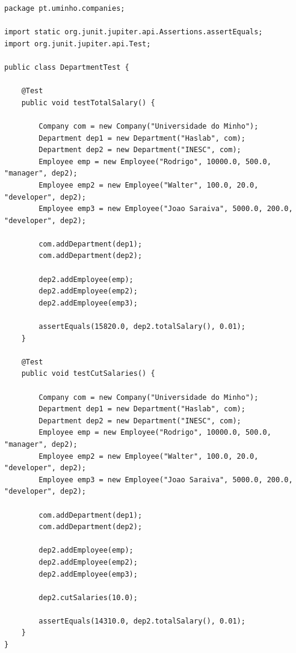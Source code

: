 \documentclass{article}
\begin{document}
\begin{lstlisting}[caption={Classe DepartmentTest},label={anoniTolambda},captionpos=t]
package pt.uminho.companies;

import static org.junit.jupiter.api.Assertions.assertEquals;
import org.junit.jupiter.api.Test;

public class DepartmentTest {

	@Test
	public void testTotalSalary() {

		Company com = new Company("Universidade do Minho");
		Department dep1 = new Department("Haslab", com);
		Department dep2 = new Department("INESC", com);
		Employee emp = new Employee("Rodrigo", 10000.0, 500.0, "manager", dep2);
		Employee emp2 = new Employee("Walter", 100.0, 20.0, "developer", dep2);
		Employee emp3 = new Employee("Joao Saraiva", 5000.0, 200.0, "developer", dep2);

		com.addDepartment(dep1);
		com.addDepartment(dep2);

		dep2.addEmployee(emp);
		dep2.addEmployee(emp2);
		dep2.addEmployee(emp3);

		assertEquals(15820.0, dep2.totalSalary(), 0.01);
	}

	@Test
	public void testCutSalaries() {

		Company com = new Company("Universidade do Minho");
		Department dep1 = new Department("Haslab", com);
		Department dep2 = new Department("INESC", com);
		Employee emp = new Employee("Rodrigo", 10000.0, 500.0, "manager", dep2);
		Employee emp2 = new Employee("Walter", 100.0, 20.0, "developer", dep2);
		Employee emp3 = new Employee("Joao Saraiva", 5000.0, 200.0, "developer", dep2);

		com.addDepartment(dep1);
		com.addDepartment(dep2);

		dep2.addEmployee(emp);
		dep2.addEmployee(emp2);
		dep2.addEmployee(emp3);

		dep2.cutSalaries(10.0);

		assertEquals(14310.0, dep2.totalSalary(), 0.01);
	}
}

\end{lstlisting}
\end{document}
